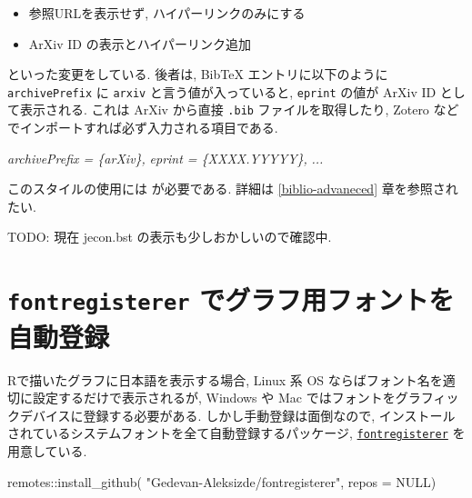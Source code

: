 \documentclass[
  xelatex,ja=standard,jafont=noto]{bxjsbook}
\newenvironment{Shaded}{\begin{snugshade}}{\end{snugshade}}
\newcommand{\AttributeTok}[1]{\textcolor[rgb]{0.77,0.63,0.00}{#1}}
\newcommand{\CommentTok}[1]{\textcolor[rgb]{0.56,0.35,0.01}{\textit{#1}}}
\newcommand{\ConstantTok}[1]{\textcolor[rgb]{0.00,0.00,0.00}{#1}}
\newcommand{\FunctionTok}[1]{\textcolor[rgb]{0.00,0.00,0.00}{#1}}
\newcommand{\NormalTok}[1]{#1}
\newcommand{\SpecialCharTok}[1]{\textcolor[rgb]{0.00,0.00,0.00}{#1}}
\newcommand{\StringTok}[1]{\textcolor[rgb]{0.31,0.60,0.02}{#1}}
\providecommand{\tightlist}{%
  \setlength{\itemsep}{0pt}\setlength{\parskip}{0pt}}
\theoremstyle{definition}
\theoremstyle{definition}
\theoremstyle{definition}
\theoremstyle{definition}
\theoremstyle{remark}
\begin{document}
\begin{itemize}
\tightlist
\item
  参照URLを表示せず, ハイパーリンクのみにする
\item
  ArXiv ID の表示とハイパーリンク追加
\end{itemize}

といった変更をしている. 後者は, BibTeX エントリに以下のように
\texttt{archivePrefix} に \texttt{arxiv} と言う値が入っていると,
\texttt{eprint} の値が ArXiv ID として表示される. これは ArXiv から直接
\texttt{.bib} ファイルを取得したり, Zotero
などでインポートすれば必ず入力される項目である.

\begin{Shaded}
\begin{Highlighting}[]
\CommentTok{archivePrefix = \{arXiv\},}
\CommentTok{eprint = \{XXXX.YYYYY\},}
\CommentTok{...}
\end{Highlighting}
\end{Shaded}

このスタイルの使用には \upBibTeX が必要である. 詳細は
\ref{biblio-advaneced} 章を参照されたい.

TODO: 現在 jecon.bst の表示も少しおかしいので確認中.

\hypertarget{fontregisterer-ux3067ux30b0ux30e9ux30d5ux7528ux30d5ux30a9ux30f3ux30c8ux3092ux81eaux52d5ux767bux9332}{%
\chapter{\texorpdfstring{\texttt{fontregisterer}
でグラフ用フォントを自動登録}{fontregisterer でグラフ用フォントを自動登録}}\label{fontregisterer-ux3067ux30b0ux30e9ux30d5ux7528ux30d5ux30a9ux30f3ux30c8ux3092ux81eaux52d5ux767bux9332}}

Rで描いたグラフに日本語を表示する場合, Linux 系 OS
ならばフォント名を適切に設定するだけで表示されるが, Windows や Mac
ではフォントをグラフィックデバイスに登録する必要がある.
しかし手動登録は面倒なので,
インストールされているシステムフォントを全て自動登録するパッケージ,
\href{https://github.com/Gedevan-Aleksizde/fontregisterer}{\texttt{fontregisterer}}
を用意している.

\begin{Shaded}
\begin{Highlighting}[numbers=left,,]
\NormalTok{remotes}\SpecialCharTok{::}\FunctionTok{install\_github}\NormalTok{(}
  \StringTok{"Gedevan{-}Aleksizde/fontregisterer"}\NormalTok{, }\AttributeTok{repos =} \ConstantTok{NULL}\NormalTok{)}
\end{Highlighting}
\end{Shaded}
\end{document}
